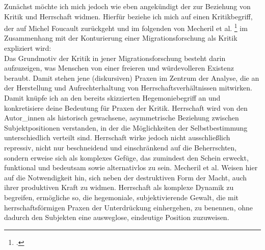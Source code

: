 Zunächst möchte ich mich jedoch wie eben angekündigt der zur Beziehung von
Kritik und Herrschaft widmen. Hierfür beziehe ich mich auf einen Kritikbegriff,
der auf Michel Foucault zurückgeht und im folgenden von Mecheril et al.
\footnotemark \footcitetext{mecherilmigration} im
Zusammenhang mit der Konturierung einer Migrationsforschung als Kritik
expliziert wird: \\ 
Das Grundmotiv der Kritik in jener Migrationsforschung
besteht darin aufzuzeigen, was Menschen von einer freieren und würdevolleren
Existenz beraubt. Damit stehen jene (diskursiven) Praxen im Zentrum der
Analyse, die an der Herstellung und Aufrechterhaltung von
Herrschaftsverhältnissen mitwirken.\footnotemark {}
Damit knüpfe ich an den bereits
skizzierten Hegemoniebegriff an und konkretisiere deine Bedeutung für Praxen
der Kritik. Herrschaft wird von den Autor\_innen als historisch gewachsene,
asymmetrische Beziehung zwischen Subjektpositionen verstanden, in der die
Möglichkeiten der Selbstbestimmung unterschiedlich verteilt sind. Herrschaft
wirke jedoch nicht ausschließlich repressiv, nicht nur beschneidend und
einschränkend auf die Beherrschten, sondern erweise sich als komplexes Gefüge,
das zumindest den Schein erweckt, \glqq funktional und bedeutsam \grqq \footnotemark {} sowie
alternativlos zu sein. Mecheril et al. Weisen hier auf die Notwendigkeit hin,
sich neben der destruktiven Form der Macht, auch ihrer produktiven Kraft zu
widmen. Herrschaft als komplexe Dynamik zu begreifen, ermögliche so, die
hegemoniale, subjektivierende Gewalt, die mit herrschaftsförmigen Praxen der
Unterdrückung einhergehen, zu benennen, ohne dadurch den Subjekten eine
ausweglose, eindeutige Position zuzuweisen.\footnotemark {}

